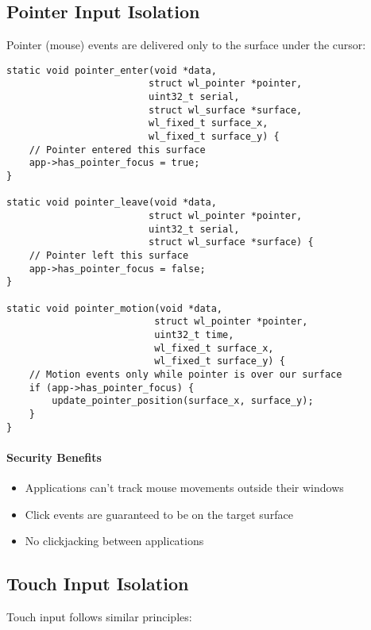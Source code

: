 \subsection{Pointer Input Isolation}

Pointer (mouse) events are delivered only to the surface under the cursor:

\begin{lstlisting}[style=cstyle, caption=Pointer Enter/Leave]
static void pointer_enter(void *data,
                         struct wl_pointer *pointer,
                         uint32_t serial,
                         struct wl_surface *surface,
                         wl_fixed_t surface_x,
                         wl_fixed_t surface_y) {
    // Pointer entered this surface
    app->has_pointer_focus = true;
}

static void pointer_leave(void *data,
                         struct wl_pointer *pointer,
                         uint32_t serial,
                         struct wl_surface *surface) {
    // Pointer left this surface
    app->has_pointer_focus = false;
}

static void pointer_motion(void *data,
                          struct wl_pointer *pointer,
                          uint32_t time,
                          wl_fixed_t surface_x,
                          wl_fixed_t surface_y) {
    // Motion events only while pointer is over our surface
    if (app->has_pointer_focus) {
        update_pointer_position(surface_x, surface_y);
    }
}
\end{lstlisting}

\paragraph{Security Benefits}

\begin{itemize}
    \item Applications can't track mouse movements outside their windows
    \item Click events are guaranteed to be on the target surface
    \item No clickjacking between applications
\end{itemize}

\subsection{Touch Input Isolation}

Touch input follows similar principles:

